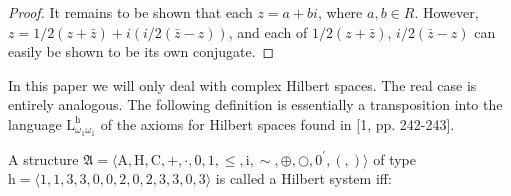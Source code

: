 \documentclass{article}
\begin{document}
{{{\begin{proof}
It remains to be shown that each $z=a+b i$, where $a, b \in R$. However, $z=1 / 2(z+\bar{z})+i(i / 2(\bar{z}-z))$, and each of $1 / 2(z+\bar{z})$, $i / 2(\bar{z}-z)$ can easily be shown to be its own conjugate.
\end{proof}
In this paper we will only deal with complex Hilbert spaces. The real case is entirely analogous. The following definition is essentially a transposition into the language $\mathrm{L}_{\omega_{1} \omega_{1}}^{\mathrm{h}}$ of the axioms for Hilbert spaces found in [1, pp. 242-243].
\begin{definition}
A structure $\mathfrak{A}=\langle\mathrm{A}, \mathrm{H}, \mathrm{C},+, \cdot, 0,1, \leq, \mathrm{i}, \sim, \oplus, \bigcirc, 0^{\prime},(,)\rangle$ of type $\mathrm{h}=\langle 1,1,3,3,0,0,2,0,2,3,3,0,3\rangle$ is called a Hilbert system iff:
\end{definition}
}}}
\end{document}
